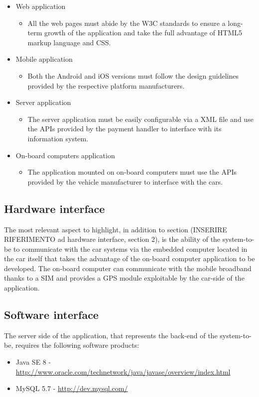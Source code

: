 \begin{itemize}
\item Web application
	\begin{itemize}
	\item[] All the web pages must abide by the W3C standards to ensure a long-term growth of the application and take the full advantage of HTML5 markup language and CSS.
	\end{itemize}
\item Mobile application
	\begin{itemize}
	\item[] Both the Android and iOS versions must follow the design guidelines provided by the respective platform manufacturers.
	\end{itemize}
\item Server application
	\begin{itemize}
	\item[] The server application must be easily configurable via a XML file and use the APIs provided by the payment handler to interface with its information system.
	\end{itemize}
\item On-board computers application
	\begin{itemize}
	\item[] The application mounted on on-board computers must use the APIs provided by the vehicle manufacturer to interface with the cars.
	\end{itemize}
\end{itemize}

\subsection{Hardware interface}
The most relevant aspect to highlight, in addition to section (INSERIRE RIFERIMENTO ad hardware interface, section 2), is the ability of the system-to-be to communicate with the car systems via the embedded computer located in the car itself that takes the advantage of the on-board computer application to be developed. The on-board computer can communicate with the mobile broadband thanks to a SIM and provides a GPS module exploitable by the car-side of the application.

\subsection{Software interface}
The server side of the application, that represents the back-end of the system-to-be, requires the following software products:
\begin{itemize}
\item Java SE 8 - \url{http://www.oracle.com/technetwork/java/javase/overview/index.html}
\item MySQL 5.7 - \url{http://dev.mysql.com/}
\end{itemize}

